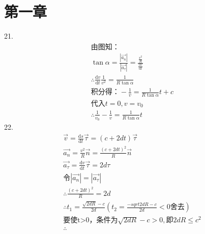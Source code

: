 \documentclass[a4paper,fleqn,twocolumn]{article}
\newcommand{\di}[1]{\mathrm{d}#1}
\newcommand{\dy}[2]{\frac{\di{#1}}{\di{#2}}}
\begin{document}
	\section*{第一章}
		21.
		\begin{gather*}
			\text{由图知：}\\
			\tan\alpha=\frac{|\vec{a_n}|}{|\vec{a_\tau}|}=\frac{\frac{v^2}{R}}{\dy{v}{t}}\\
			\therefore \dy{v}{t}\frac{1}{v^2}=\frac{1}{R\tan\alpha}\\
			\text{积分得：}-\frac{1}{v}=\frac{1}{R\tan\alpha}t+c\\
			\text{代入}t=0,v=v_0\\
			\therefore \frac{1}{v_0}-\frac{1}{v}=\frac{1}{R\tan\alpha}t
		\end{gather*}
		22.
		\begin{gather*}
			\vec{v}=\dy{s}{t}\vec{\tau}=(c+2dt)\vec{\tau}\\  
			\vec{a_n}=\frac{v^2}{R}\vec{n}=\frac{(c+2dt)^2}{R}\vec{n}\\
			\vec{a_\tau}=\dy{v}{t}\vec{\tau}=2d\tau\\
			\text{令}|\vec{a_n}|=|\vec{a_\tau}|\\
			\therefore \frac{(c+2dt)^2}{R}=2d\\
			\therefore t_1=\frac{\sqrt{2dR}-c}{2d}\left(t_2=\frac{-sqrt{2dR}-c}{2d}<0舍去\right)\\
			\text{要使t>0，条件为}\sqrt{2dR}-c>0,\text{即}2dR\leqslant c^2\\
			\therefore 
		\end{gather*}
\end{document}
